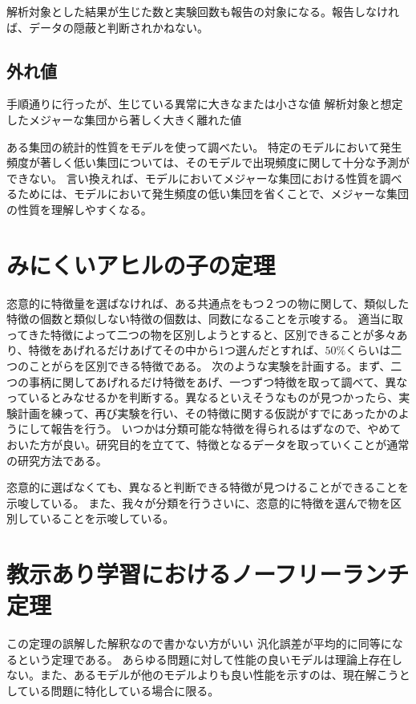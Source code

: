 解析対象とした結果が生じた数と実験回数も報告の対象になる。報告しなければ、データの隠蔽と判断されかねない。


\subsection{外れ値}
手順通りに行ったが、生じている異常に大きなまたは小さな値
解析対象と想定したメジャーな集団から著しく大きく離れた値

ある集団の統計的性質をモデルを使って調べたい。
特定のモデルにおいて発生頻度が著しく低い集団については、そのモデルで出現頻度に関して十分な予測ができない。
言い換えれば、モデルにおいてメジャーな集団における性質を調べるためには、モデルにおいて発生頻度の低い集団を省くことで、メジャーな集団の性質を理解しやすくなる。



\section{みにくいアヒルの子の定理}
恣意的に特徴量を選ばなければ、ある共通点をもつ２つの物に関して、類似した特徴の個数と類似しない特徴の個数は、同数になることを示唆する。
適当に取ってきた特徴によって二つの物を区別しようとすると、区別できることが多々あり、特徴をあげれるだけあげてその中から1つ選んだとすれば、$50\%$くらいは二つのことがらを区別できる特徴である。
次のような実験を計画する。まず、二つの事柄に関してあげれるだけ特徴をあげ、一つずつ特徴を取って調べて、異なっているとみなせるかを判断する。異なるといえそうなものが見つかったら、実験計画を練って、再び実験を行い、その特徴に関する仮説がすでにあったかのようにして報告を行う。
いつかは分類可能な特徴を得られるはずなので、やめておいた方が良い。研究目的を立てて、特徴となるデータを取っていくことが通常の研究方法である。

恣意的に選ばなくても、異なると判断できる特徴が見つけることができることを示唆している。
また、我々が分類を行うさいに、恣意的に特徴を選んで物を区別していることを示唆している。
\fi

\section{教示あり学習におけるノーフリーランチ定理}
この定理の誤解した解釈なので書かない方がいい
汎化誤差が平均的に同等になるという定理である。
あらゆる問題に対して性能の良いモデルは理論上存在しない。また、あるモデルが他のモデルよりも良い性能を示すのは、現在解こうとしている問題に特化している場合に限る。


